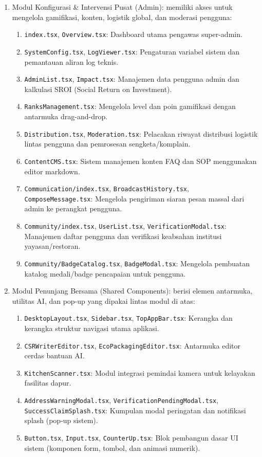 \begin{enumerate}[label=\arabic*.]
    \item Modul Konfigurasi \& Intervensi Pusat (Admin): memiliki akses untuk mengelola gamifikasi, konten, logistik global, dan moderasi pengguna:
    \begin{enumerate}[label=\alph*.]
        \item \texttt{index.tsx}, \texttt{Overview.tsx}: Dashboard utama pengawas super-admin.
        \item \texttt{SystemConfig.tsx}, \texttt{LogViewer.tsx}: Pengaturan variabel sistem dan pemantauan aliran log teknis.
        \item \texttt{AdminList.tsx}, \texttt{Impact.tsx}: Manajemen data pengguna admin dan kalkulasi SROI (Social Return on Investment).
        \item \texttt{RanksManagement.tsx}: Mengelola level dan poin gamifikasi dengan antarmuka drag-and-drop.
        \item \texttt{Distribution.tsx}, \texttt{Moderation.tsx}: Pelacakan riwayat distribusi logistik lintas pengguna dan pemrosesan sengketa/komplain.
        \item \texttt{ContentCMS.tsx}: Sistem manajemen konten FAQ dan SOP menggunakan editor markdown.
        \item \texttt{Communication/index.tsx}, \texttt{BroadcastHistory.tsx}, \texttt{ComposeMessage.tsx}: Mengelola pengiriman siaran pesan massal dari admin ke perangkat pengguna.
        \item \texttt{Community/index.tsx}, \texttt{UserList.tsx}, \texttt{VerificationModal.tsx}: Manajemen daftar pengguna dan verifikasi keabsahan institusi yayasan/restoran.
        \item \texttt{Community/BadgeCatalog.tsx}, \texttt{BadgeModal.tsx}: Mengelola pembuatan katalog medali/badge pencapaian untuk pengguna.
    \end{enumerate}

    \item Modul Penunjang Bersama (Shared Components): berisi elemen antarmuka, utilitas AI, dan pop-up yang dipakai lintas modul di atas:
    \begin{enumerate}[label=\alph*.]
        \item \texttt{DesktopLayout.tsx}, \texttt{Sidebar.tsx}, \texttt{TopAppBar.tsx}: Kerangka dan kerangka struktur navigasi utama aplikasi.
        \item \texttt{CSRWriterEditor.tsx}, \texttt{EcoPackagingEditor.tsx}: Antarmuka editor cerdas bantuan AI.
        \item \texttt{KitchenScanner.tsx}: Modul integrasi pemindai kamera untuk kelayakan fasilitas dapur.
        \item \texttt{AddressWarningModal.tsx}, \texttt{VerificationPendingModal.tsx}, \texttt{SuccessClaimSplash.tsx}: Kumpulan modal peringatan dan notifikasi splash (pop-up sistem).
        \item \texttt{Button.tsx}, \texttt{Input.tsx}, \texttt{CounterUp.tsx}: Blok pembangun dasar UI sistem (komponen form, tombol, dan animasi numerik).
    \end{enumerate}
\end{enumerate}


